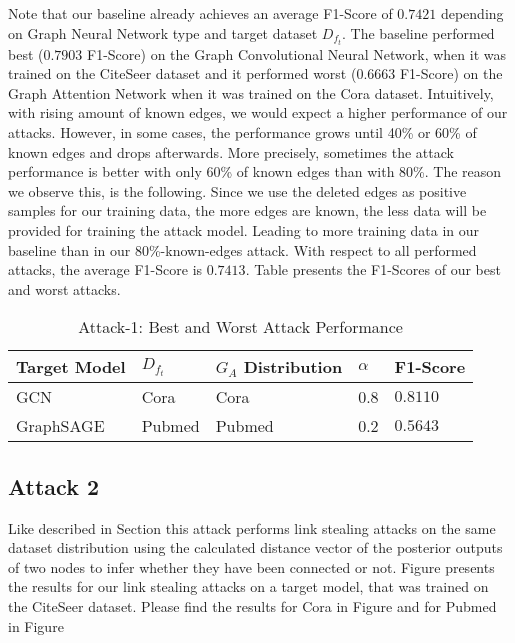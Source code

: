             Note that our baseline already achieves an average F1-Score of $0.7421$ depending on Graph Neural Network type and target dataset $D_{f_t}$.
            The baseline performed best ($0.7903$ F1-Score) on the Graph Convolutional Neural Network, when it was trained on the  CiteSeer dataset and it performed worst ($0.6663$ F1-Score) on the Graph Attention Network when it was trained on the Cora dataset.
            Intuitively, with rising amount of known edges, we would expect a higher performance of our attacks.
            However, in some cases, the performance grows until 40\% or 60\% of known edges and drops afterwards.
            More precisely, sometimes the attack performance is better with only 60\% of known edges than with 80\%.
            The reason we observe this, is the following. 
            Since we use the deleted edges as positive samples for our training data, the more edges are known, the less data will be provided for training the attack model. 
            Leading to more training data in our baseline than in our 80\%-known-edges attack.
            With respect to all performed attacks, the average F1-Score is $0.7413$.
            Table  presents the F1-Scores of our best and worst attacks.

            \vspace{0.48cm}
            \begin{table}[!h]
                \centering
                \footnotesize
                \begin{tabular}{l|l|l|l|l|}
                \toprule
                Target Model & $D_{f_t}$ & $G_A$ Distribution & $\alpha$ & F1-Score \\
                \midrule
                GCN       & Cora   & Cora   & 0.8 & $0.8110$ \\
                GraphSAGE & Pubmed & Pubmed & 0.2 & $0.5643$ \\
                
                \bottomrule
                \end{tabular}
                \caption{Attack-1: Best and Worst Attack Performance}
                \label{table:attack1-best-and-worst-performance}
            \end{table}

        \subsection*{Attack 2}
            Like described in Section  this attack performs link stealing attacks on the same dataset distribution using the calculated distance vector of the posterior outputs of two nodes to infer whether they have been connected or not. 
            Figure  presents the results for our link stealing attacks on a target model, that was trained on the CiteSeer dataset.
            Please find the results for Cora in Figure  and for Pubmed in Figure 

